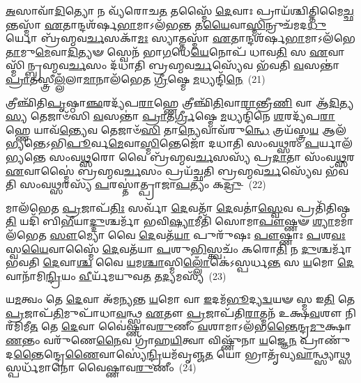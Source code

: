 {\anuvakamend[{\-\ul{𑌸}\-\-\ul{𑌙𑍍𑌗𑍍𑌰𑌾}\-𑌮𑍇 𑌤𑍇𑌨𑌾𑌲᳴𑌮𑌭𑌿𑌮𑌾\-\ul{𑌤𑌿}\-𑌘𑍍𑌨𑍇 \ul{𑌲}\-𑌲𑌾𑌮𑌂᳴ 𑌪𑍍𑌰𑌾\-\ul{𑌶𑍃}\-𑌙𑍍𑌗𑌮𑍈\-\ul{𑌨𑌂} 𑌪𑌞𑍍𑌚᳴𑌦𑌶 𑌚।3।}]}

\-\ul{𑌅}\-𑌸𑌾𑌵𑌾᳴\-\ul{𑌦𑌿}\-𑌤𑍍𑌯𑍋 𑌨 𑌵𑍍𑌯᳴𑌰𑍋𑌚\-\ul{𑌤} 𑌤𑌸𑍍𑌮𑍈᳴ \ul{𑌦𑍇}\-𑌵𑌾𑌃 𑌪𑍍𑌰𑌾𑌯᳴𑌶𑍍𑌚𑌿𑌤𑍍𑌤𑌿\-𑌮𑍈\-\ul{𑌚𑍍𑌛}\-𑌨𑍍𑌤𑌸𑍍𑌮𑌾᳴ \ul{𑌏}\-𑌤𑌾𑌨𑍍𑌦𑌶᳴𑌰𑍍\mbox{}𑌷\-\ul{𑌭𑌾}\-𑌮𑌾\-𑌽𑌲᳴𑌭\-\ul{𑌨𑍍𑌤} 𑌤\-\ul{𑌯𑍈}\-𑌵𑌾\-\ul{𑌸𑍍𑌮𑌿}\-𑌨𑍍𑌰𑍁𑌚᳴𑌮𑌦\-\ul{𑌧𑍁}\-𑌰𑍍𑌯𑍋 𑌬𑍍𑌰᳴𑌹𑍍𑌮𑌵\-\ul{𑌰𑍍𑌚}\-𑌸𑌕𑌾᳴\-\ul{𑌮𑌃} 𑌸𑍍𑌯𑌾𑌤𑍍𑌤𑌸𑍍𑌮𑌾᳴ \ul{𑌏}\-𑌤𑌾𑌨𑍍𑌦𑌶᳴𑌰𑍍\mbox{}𑌷\-\ul{𑌭𑌾}\-𑌮𑌾\-𑌽𑌲᳴𑌭𑍇\-\ul{𑌤𑌾}\-𑌮𑍁\-\ul{𑌮𑍇}\-𑌵𑌾\-\-\ul{𑌦𑌿}\-𑌤𑍍𑌯𑍟 𑌸𑍍𑌵𑍇𑌨᳴ 𑌭𑌾\-\ul{𑌗}\-𑌧𑍇\-\ul{𑌯𑍇}\-𑌨𑍋𑌪᳴ 𑌧𑌾𑌵\-\ul{𑌤𑌿} 𑌸 \ul{𑌏}\-𑌵𑌾𑌸𑍍𑌮𑌿᳴𑌨𑍍𑌬𑍍𑌰𑌹𑍍𑌮\-𑌵\-\ul{𑌰𑍍𑌚}\-𑌸𑌂 𑌦᳴𑌧𑌾𑌤𑌿 𑌬𑍍𑌰𑌹𑍍𑌮𑌵\-\ul{𑌰𑍍𑌚}\-𑌸𑍍𑌯𑍇᳴𑌵 𑌭᳴𑌵𑌤𑌿 \ul{𑌵}\-𑌸𑌨𑍍𑌤𑌾॑ \ul{𑌪𑍍𑌰𑌾}\-𑌤𑌸𑍍𑌤𑍍𑌰𑍀\-\ul{𑌲𑍍𑌲𑌁}\-𑌲𑌾\-\ul{𑌮𑌾}\-𑌨𑌾\-𑌲᳴𑌭𑍇𑌤 \ul{𑌗𑍍𑌰𑍀}\-𑌷𑍍𑌮𑍇 \ul{𑌮}\-𑌧𑍍𑌯𑌨𑍍𑌦𑌿᳴\-\ul{𑌨𑍇}\-~(21)

𑌤𑍍𑌰𑍀𑌞𑍍𑌛𑌿᳴𑌤𑌿\-\ul{𑌪𑍃}\-𑌷𑍍𑌠𑌾\-\ul{𑌞𑍍𑌛}\-𑌰𑌦𑍍𑌯᳴𑌪\-\ul{𑌰𑌾}\-𑌹𑍍𑌣𑍇 𑌤𑍍𑌰𑍀𑌞𑍍𑌛𑌿᳴\-\ul{𑌤𑌿}\-𑌵𑌾\-\ul{𑌰𑌾}\-𑌨𑍍𑌤𑍍𑌰𑍀\-\ul{𑌣𑌿} 𑌵𑌾 𑌆᳴\-\ul{𑌦𑌿}\-𑌤𑍍𑌯\-\ul{𑌸𑍍𑌯} 𑌤𑍇𑌜𑌾𑍞᳴𑌸𑌿 \ul{𑌵}\-𑌸𑌨𑍍𑌤𑌾॑ \ul{𑌪𑍍𑌰𑌾}\-𑌤\-\ul{𑌰𑍍𑌗𑍍𑌰𑍀}\-𑌷𑍍𑌮𑍇 \ul{𑌮}\-𑌧𑍍𑌯𑌨𑍍𑌦𑌿᳴𑌨𑍇 \ul{𑌶}\-𑌰𑌦𑍍𑌯᳴𑌪\-\ul{𑌰𑌾}\-𑌹𑍍𑌣𑍇 𑌯𑌾𑌵᳴\-\ul{𑌨𑍍𑌤𑍍𑌯𑍇}\-𑌵 𑌤𑍇𑌜𑌾𑍞᳴\-\ul{𑌸𑌿} 𑌤𑌾\-\ul{𑌨𑍍𑌯𑍇}\-𑌵𑌾𑌵᳴\-𑌰𑍁\-\ul{𑌨𑍍𑌧𑍇} 𑌤𑍍𑌰𑌯᳴𑌸𑍍𑌤𑍍𑌰\-\ul{𑌯} 𑌆𑌲᳴𑌭𑍍𑌯𑌨𑍍𑌤𑍇\-𑌽𑌭𑌿\-\ul{𑌪𑍂}\-𑌰𑍍𑌵\-\ul{𑌮𑍇}\-𑌵𑌾\-\ul{𑌸𑍍𑌮𑌿}\-𑌨𑍍𑌤𑍇𑌜𑍋᳴ 𑌦𑌧𑌾𑌤𑌿 𑌸𑌂𑌵\-\ul{𑌥𑍍𑌸}\-𑌰𑌂 \ul{𑌪}\-𑌰𑍍𑌯𑌾𑌲᳴𑌭𑍍𑌯𑌨𑍍𑌤𑍇 𑌸𑌂𑌵\-\ul{𑌥𑍍𑌸}\-𑌰𑍋 𑌵𑍈 𑌬𑍍𑌰᳴𑌹𑍍𑌮𑌵\-\ul{𑌰𑍍𑌚}\-𑌸𑌸𑍍𑌯᳴ 𑌪𑍍𑌰\-\ul{𑌦𑌾}\-𑌤𑌾 𑌸𑌂᳴𑌵\-\ul{𑌥𑍍𑌸}\-𑌰 \ul{𑌏}\-𑌵𑌾𑌸𑍍𑌮𑍈॑ 𑌬𑍍𑌰𑌹𑍍𑌮𑌵\-\ul{𑌰𑍍𑌚}\-𑌸𑌂 𑌪𑍍𑌰𑌯᳴𑌚𑍍𑌛𑌤𑌿 𑌬𑍍𑌰𑌹𑍍𑌮𑌵\-\ul{𑌰𑍍𑌚}\-𑌸𑍍𑌯𑍇᳴𑌵 𑌭᳴𑌵𑌤𑌿 𑌸𑌂𑌵\-\ul{𑌥𑍍𑌸}\-𑌰𑌸𑍍𑌯᳴ \ul{𑌪}\-𑌰𑌸𑍍𑌤𑌾॑𑌤𑍍𑌪𑍍𑌰𑌾𑌜𑌾\-\ul{𑌪}\-𑌤𑍍𑌯𑌂 𑌕\-\ul{𑌦𑍍𑌰𑍁}\--~(22)

𑌮𑌾𑌲᳴𑌭𑍇𑌤 \ul{𑌪𑍍𑌰}\-𑌜𑌾𑌪᳴\-\ul{𑌤𑌿𑌃} 𑌸𑌰𑍍𑌵𑌾᳴ \ul{𑌦𑍇}\-𑌵𑌤𑌾᳴ \ul{𑌦𑍇}\-𑌵𑌤𑌾॑\-\ul{𑌸𑍍𑌵𑍇}\-𑌵 𑌪𑍍𑌰𑌤𑌿᳴𑌤𑌿𑌷𑍍𑌠\-\ul{𑌤𑌿} 𑌯𑌦𑌿᳴ 𑌬𑌿\-\ul{𑌭𑍀}\-𑌯𑌾\-\ul{𑌦𑍍𑌦𑍁}\-𑌶𑍍𑌚𑌰𑍍𑌮𑌾᳴ 𑌭𑌵𑌿\-\ul{𑌷𑍍𑌯𑌾}\-𑌮𑍀𑌤𑌿᳴ 𑌸𑍋𑌮𑌾\-\ul{𑌪𑍗}\-𑌷𑍍𑌣𑍟 \ul{𑌶𑍍𑌯𑌾}\-𑌮𑌮𑌾𑌲᳴𑌭𑍇𑌤 \ul{𑌸𑍗}\-𑌮𑍍𑌯𑍋 𑌵𑍈 \ul{𑌦𑍇}\-𑌵𑌤᳴\-\ul{𑌯𑌾} 𑌪𑍁𑌰𑍁᳴𑌷𑌃 \ul{𑌪𑍗}\-𑌷𑍍𑌣𑌾𑌃 \ul{𑌪}\-𑌶\-\ul{𑌵𑌃} 𑌸𑍍𑌵\-\ul{𑌯𑍈}\-𑌵𑌾𑌸𑍍𑌮𑍈᳴ \ul{𑌦𑍇}\-𑌵𑌤᳴𑌯𑌾 \ul{𑌪}\-𑌶𑍁\-\ul{𑌭𑌿}\-𑌸𑍍𑌤𑍍𑌵𑌚𑌂᳴ 𑌕𑌰𑍋\-\ul{𑌤𑌿} 𑌨 \ul{𑌦𑍁}\-𑌶𑍍𑌚𑌰𑍍𑌮𑌾᳴ 𑌭𑌵𑌤𑌿 \ul{𑌦𑍇}\-𑌵𑌾\-\ul{𑌶𑍍𑌚} 𑌵𑍈 \ul{𑌯}\-𑌮\-\ul{𑌶𑍍𑌚𑌾}\-𑌸𑍍𑌮𑌿\-\ul{𑌲𑍍𑌲𑍋𑌁}\-𑌕𑍇॑\-𑌽𑌸𑍍𑌪𑌰𑍍𑌧\-\ul{𑌨𑍍𑌤} 𑌸 \ul{𑌯}\-𑌮𑍋 \ul{𑌦𑍇}\-𑌵𑌾𑌨𑌾᳴𑌮𑌿\-\ul{𑌨𑍍𑌦𑍍𑌰𑌿}\-𑌯𑌂 \ul{𑌵𑍀}\-𑌰𑍍𑌯᳴𑌮𑌯𑍁𑌵\-\ul{𑌤} 𑌤\-\ul{𑌦𑍍𑌯}\-𑌮𑌸𑍍𑌯᳴~(23)

𑌯\-\ul{𑌮}\-𑌤𑍍𑌵𑌂 𑌤𑍇 \ul{𑌦𑍇}\-𑌵𑌾 𑌅᳴𑌮𑌨𑍍𑌯𑌨𑍍𑌤 \ul{𑌯}\-𑌮𑍋 𑌵𑌾 \ul{𑌇}\-𑌦𑌮᳴\-\ul{𑌭𑍂}\-𑌦𑍍𑌯\-\ul{𑌦𑍍𑌵}\-𑌯𑍟 𑌸𑍍𑌮 𑌇\-\ul{𑌤𑌿} 𑌤𑍇 \ul{𑌪𑍍𑌰}\-𑌜𑌾𑌪᳴\-\ul{𑌤𑌿}\-𑌮𑍁𑌪𑌾᳴𑌧𑌾\-\ul{𑌵}\-𑌨𑍍𑌥𑍍𑌸 \ul{𑌏}\-𑌤𑍗 \ul{𑌪𑍍𑌰}\-𑌜𑌾𑌪᳴𑌤𑌿\-\ul{𑌰𑌾}\-𑌤𑍍𑌮𑌨᳴ 𑌉𑌕𑍍𑌷\-\ul{𑌵}\-𑌶𑍗 𑌨𑌿𑌰᳴𑌮𑌿𑌮𑍀\-\ul{𑌤} 𑌤𑍇 \ul{𑌦𑍇}\-𑌵𑌾 𑌵𑍈॑𑌷𑍍𑌣𑌾𑌵\-\ul{𑌰𑍁}\-𑌣𑍀𑌂 \ul{𑌵}\-𑌶𑌾𑌮𑌾\-𑌽𑌲᳴𑌭\-\ul{𑌨𑍍𑌤𑍈}\-𑌨𑍍𑌦𑍍𑌰\-\ul{𑌮𑍁}\-𑌕𑍍𑌷𑌾\-\ul{𑌣}\-𑌨𑍍𑌤𑌂 𑌵𑌰𑍁᳴𑌣𑍇\-\ul{𑌨𑍈}\-𑌵 𑌗𑍍𑌰𑌾᳴𑌹\-\ul{𑌯𑌿}\-𑌤𑍍𑌵𑌾 𑌵𑌿𑌷𑍍𑌣𑍁᳴𑌨𑌾 \ul{𑌯}\-𑌜𑍍𑌞𑍇\-\ul{𑌨} 𑌪𑍍𑌰𑌾𑌣𑍁᳴𑌦\-\ul{𑌨𑍍𑌤𑍈}\-𑌨𑍍𑌦𑍍𑌰𑍇\-\ul{𑌣𑍈}\-𑌵𑌾𑌸𑍍𑌯𑍇॑\-\ul{𑌨𑍍𑌦𑍍𑌰𑌿}\-𑌯𑌮᳴𑌵𑍃𑌞𑍍𑌜\-\ul{𑌤} 𑌯𑍋 𑌭𑍍𑌰𑌾𑌤𑍃᳴𑌵𑍍𑌯\-\ul{𑌵𑌾}\-𑌨𑍍𑌥𑍍𑌸𑍍𑌯𑌾𑌥𑍍𑌸 𑌸𑍍𑌪𑌰𑍍𑌧᳴𑌮𑌾𑌨𑍋 𑌵𑍈𑌷𑍍𑌣𑌾𑌵\-\ul{𑌰𑍁}\-𑌣𑍀𑌂~(24)

